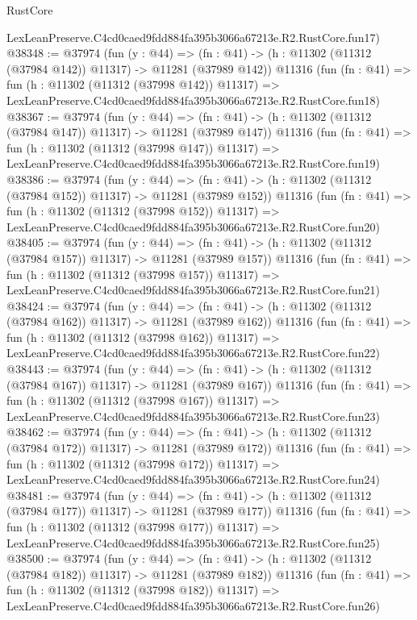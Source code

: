\begin{lexlean}{RustCore}
\begin{coremodule}
    LexLeanPreserve.C4cd0caed9fdd884fa395b3066a67213e.R2.RustCore.fun17)
@38348 := @37974
    (fun (y : @44) =>
    (fn : @41) -> (h : @11302 (@11312 (@37984 @142)) @11317) -> @11281 (@37989 @142))
    @11316
    (fun (fn : @41) =>
    fun (h : @11302 (@11312 (@37998 @142)) @11317) =>
    LexLeanPreserve.C4cd0caed9fdd884fa395b3066a67213e.R2.RustCore.fun18)
@38367 := @37974
    (fun (y : @44) =>
    (fn : @41) -> (h : @11302 (@11312 (@37984 @147)) @11317) -> @11281 (@37989 @147))
    @11316
    (fun (fn : @41) =>
    fun (h : @11302 (@11312 (@37998 @147)) @11317) =>
    LexLeanPreserve.C4cd0caed9fdd884fa395b3066a67213e.R2.RustCore.fun19)
@38386 := @37974
    (fun (y : @44) =>
    (fn : @41) -> (h : @11302 (@11312 (@37984 @152)) @11317) -> @11281 (@37989 @152))
    @11316
    (fun (fn : @41) =>
    fun (h : @11302 (@11312 (@37998 @152)) @11317) =>
    LexLeanPreserve.C4cd0caed9fdd884fa395b3066a67213e.R2.RustCore.fun20)
@38405 := @37974
    (fun (y : @44) =>
    (fn : @41) -> (h : @11302 (@11312 (@37984 @157)) @11317) -> @11281 (@37989 @157))
    @11316
    (fun (fn : @41) =>
    fun (h : @11302 (@11312 (@37998 @157)) @11317) =>
    LexLeanPreserve.C4cd0caed9fdd884fa395b3066a67213e.R2.RustCore.fun21)
@38424 := @37974
    (fun (y : @44) =>
    (fn : @41) -> (h : @11302 (@11312 (@37984 @162)) @11317) -> @11281 (@37989 @162))
    @11316
    (fun (fn : @41) =>
    fun (h : @11302 (@11312 (@37998 @162)) @11317) =>
    LexLeanPreserve.C4cd0caed9fdd884fa395b3066a67213e.R2.RustCore.fun22)
@38443 := @37974
    (fun (y : @44) =>
    (fn : @41) -> (h : @11302 (@11312 (@37984 @167)) @11317) -> @11281 (@37989 @167))
    @11316
    (fun (fn : @41) =>
    fun (h : @11302 (@11312 (@37998 @167)) @11317) =>
    LexLeanPreserve.C4cd0caed9fdd884fa395b3066a67213e.R2.RustCore.fun23)
@38462 := @37974
    (fun (y : @44) =>
    (fn : @41) -> (h : @11302 (@11312 (@37984 @172)) @11317) -> @11281 (@37989 @172))
    @11316
    (fun (fn : @41) =>
    fun (h : @11302 (@11312 (@37998 @172)) @11317) =>
    LexLeanPreserve.C4cd0caed9fdd884fa395b3066a67213e.R2.RustCore.fun24)
@38481 := @37974
    (fun (y : @44) =>
    (fn : @41) -> (h : @11302 (@11312 (@37984 @177)) @11317) -> @11281 (@37989 @177))
    @11316
    (fun (fn : @41) =>
    fun (h : @11302 (@11312 (@37998 @177)) @11317) =>
    LexLeanPreserve.C4cd0caed9fdd884fa395b3066a67213e.R2.RustCore.fun25)
@38500 := @37974
    (fun (y : @44) =>
    (fn : @41) -> (h : @11302 (@11312 (@37984 @182)) @11317) -> @11281 (@37989 @182))
    @11316
    (fun (fn : @41) =>
    fun (h : @11302 (@11312 (@37998 @182)) @11317) =>
    LexLeanPreserve.C4cd0caed9fdd884fa395b3066a67213e.R2.RustCore.fun26)

\end{coremodule}
\end{lexlean}
